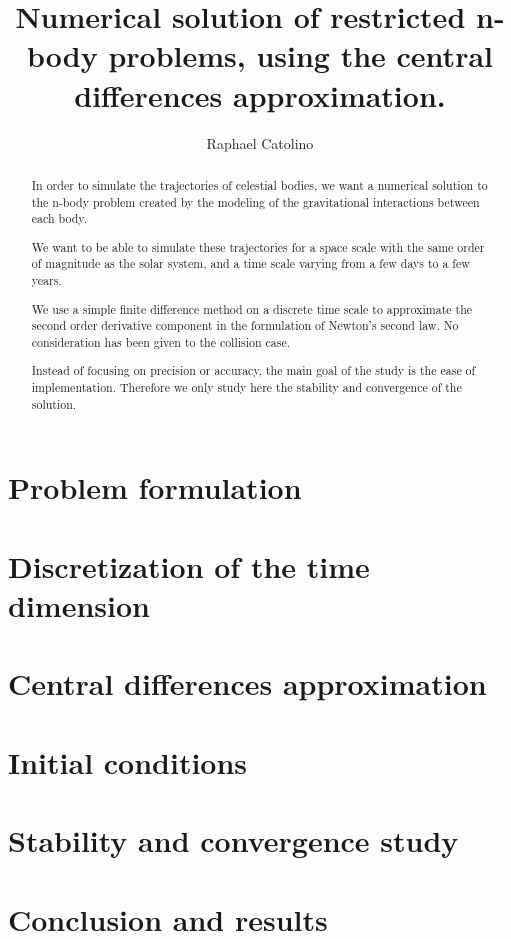 \documentclass[a4paper,11pt]{article}
\author{Raphael Catolino}
\title{Numerical solution of restricted n-body problems, using
the central differences approximation.}
\begin{document}
\maketitle

\begin{abstract}
  In order to simulate the trajectories of celestial bodies,
  we want a numerical solution to the n-body problem created
  by the modeling of the gravitational interactions between each body.

  We want to be able to simulate these trajectories for a space scale
  with the same order of magnitude as the solar system, and a time scale
  varying from a few days to a few years.

  We use a simple finite difference method on a discrete time scale
  to approximate the second order derivative component in the formulation
  of Newton's second law. No consideration has been given to the collision case.

  Instead of focusing on precision or accuracy, the main goal of the
  study is the ease of implementation. Therefore we only study here the
  stability and convergence of the solution.
\end{abstract}
\newpage
\tableofcontents
\newpage

\section{Problem formulation}
\section{Discretization of the time dimension}
\section{Central differences approximation}
\section{Initial conditions}
\section{Stability and convergence study}
\section{Conclusion and results}
\end{document}
